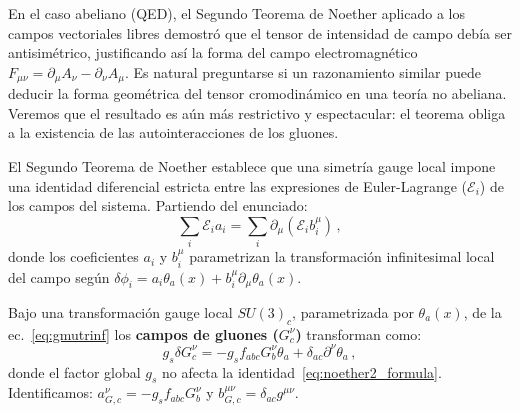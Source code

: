 En el caso abeliano (QED), el Segundo Teorema de Noether aplicado a los campos vectoriales libres demostró que el tensor de intensidad de campo debía ser antisimétrico, justificando así la forma del campo electromagnético $F_{\mu\nu} = \partial_\mu A_\nu - \partial_\nu A_\mu$. Es natural preguntarse si un razonamiento similar puede deducir la forma geométrica del tensor cromodinámico en una teoría no abeliana. Veremos que el resultado es aún más restrictivo y espectacular: el teorema obliga a la existencia de las autointeracciones de los gluones.


El Segundo Teorema de Noether establece que una simetría gauge local impone una identidad diferencial estricta entre las expresiones de Euler-Lagrange ($\mathcal{E}_i$) de los campos del sistema. Partiendo del enunciado:
\begin{equation}
    \sum_i \mathcal{E}_i a_i = \sum_i \partial_\mu (\mathcal{E}_i b^\mu_i) \, ,
    \label{eq:noether2_formula}
\end{equation}
donde los coeficientes $a_i$ y $b_i^\mu$ parametrizan la transformación infinitesimal local del campo según $\delta \phi_i = a_i \theta_a(x) + b^\mu_i \partial_\mu \theta_a(x)$.

Bajo una transformación gauge local $SU(3)_c$, parametrizada por $\theta_a(x)$, de la ec.~\eqref{eq:gmutrinf} 
los \textbf{campos de gluones ($G^\nu_c$)} transforman como: 
    \[g_{s}\delta G^\nu_c = -g_s f_{abc} G^\nu_b \theta_a + \delta_{ac} \partial^\nu \theta_a\,,\]
donde el factor global $g_{s}$ no afecta la identidad~\eqref{eq:noether2_formula}. Identificamos: $a^\nu_{G, c} = -g_s f_{abc} G^\nu_b$ y $b^{\mu\nu}_{G, c} = \delta_{ac} g^{\mu\nu}$.

